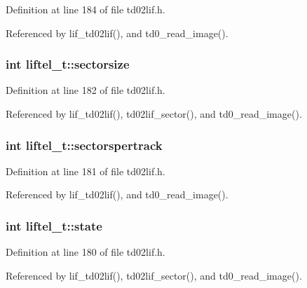 Definition at line 184 of file td02lif.\+h.



Referenced by lif\+\_\+td02lif(), and td0\+\_\+read\+\_\+image().

\subsubsection[{\texorpdfstring{sectorsize}{sectorsize}}]{\setlength{\rightskip}{0pt plus 5cm}int liftel\+\_\+t\+::sectorsize}\hypertarget{structliftel__t_aaf7b830b7b2791c56c83082bb9dba7d9}{}\label{structliftel__t_aaf7b830b7b2791c56c83082bb9dba7d9}


Definition at line 182 of file td02lif.\+h.



Referenced by lif\+\_\+td02lif(), td02lif\+\_\+sector(), and td0\+\_\+read\+\_\+image().

\subsubsection[{\texorpdfstring{sectorspertrack}{sectorspertrack}}]{\setlength{\rightskip}{0pt plus 5cm}int liftel\+\_\+t\+::sectorspertrack}\hypertarget{structliftel__t_a69b69f0cd2e8f0017178bafd5a7a7585}{}\label{structliftel__t_a69b69f0cd2e8f0017178bafd5a7a7585}


Definition at line 181 of file td02lif.\+h.



Referenced by lif\+\_\+td02lif(), and td0\+\_\+read\+\_\+image().

\subsubsection[{\texorpdfstring{state}{state}}]{\setlength{\rightskip}{0pt plus 5cm}int liftel\+\_\+t\+::state}\hypertarget{structliftel__t_a579b9a2411fc6cf4bcdd4cac15d48e49}{}\label{structliftel__t_a579b9a2411fc6cf4bcdd4cac15d48e49}


Definition at line 180 of file td02lif.\+h.



Referenced by lif\+\_\+td02lif(), td02lif\+\_\+sector(), and td0\+\_\+read\+\_\+image().

